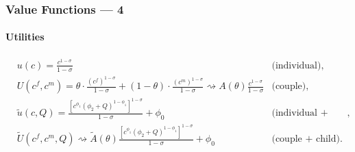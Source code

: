 \documentclass{beamer}
\begin{document}
\begin{frame}[label=value-functions]
\frametitle{Value Functions --- 4}
\framesubtitle{Utilities}
\hspace{-2em}
{\scriptsize
\begin{align*}
 & u(c) = \frac{c^{1-\sigma}}{1-\sigma}  & \text{(individual)},\\
 & U(c^f,c^m) = \theta\cdot \frac{(c^f)^{1-\sigma}}{1-\sigma} + (1-\theta)\cdot \frac{(c^m)^{1-\sigma}}{1-\sigma} \rightsquigarrow A(\theta) \frac{c^{1-\sigma}}{1-\sigma}  & \text{(couple)},                 \\
 & \tilde{u}(c,Q) = \frac{\left[c^{\phi_1} (\phi_2 + Q)^{1-\phi_1} \right]^{1-\sigma}}{1-\sigma} + \phi_0 & \text{(individual + child)},\\
 & \tilde{U}(c^f,c^m,Q) \rightsquigarrow \tilde{A}(\theta)  \frac{\left[c^{\phi_1} (\phi_2 + Q)^{1-\phi_1} \right]^{1-\sigma}}{1-\sigma} + \phi_0 & \text{(couple + child)}.
\end{align*}
}
\hyperlink{utilities}{}
\end{frame}
\end{document}
